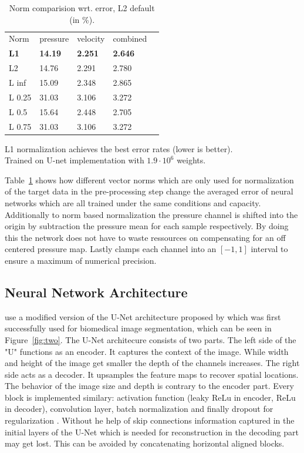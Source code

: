 \documentclass[acmtog]{techreportacmart}
\begin{document}
\begin{table}[h]
\caption{Norm comparision wrt. error, L2 default (in \%).}
\label{tab:one}
\begin{center}
\begin{tabular}{l|l|l|l|l}
  \toprule
  Norm   & pressure   &	velocity    & combined \\
  \bf L1	 & \bf 14.19	  & \bf 2.251		& \bf 2.646    \\
  L2	 & 14.76	  & 2.291		& 2.780	   \\
  L inf	 & 15.09	  & 2.348		& 2.865	   \\
  L 0.25 & 31.03	  & 3.106		& 3.272	   \\
  L 0.5  & 15.64	  & 2.448		& 2.705	   \\
  L 0.75 & 31.03	  & 3.106		& 3.272	   \\	
  \bottomrule
\end{tabular}
\end{center}
\bigskip\centering
\footnotesize L1 normalization achieves the best error rates (lower is better). \\
Trained on \cite{Thuerey20} U-net implementation with $1.9 \cdot 10^{6}$ weights.
\end{table}%

Table~\ref{tab:one} shows how different vector norms which are only used for normalization of the target data in the pre-processing step change the averaged error of neural networks which are all trained under the same conditions and capacity. \\
Additionally to norm based normalization the pressure channel is shifted into the origin by subtraction the pressure mean for each sample respectively. By doing this the network does not have to waste ressources on compensating for an off centered pressure map. Lastly \cite{Thuerey20} clamps each channel into an $[-1, 1]$ interval to ensure a maximum of numerical precision.

\subsection{Neural Network Architecture}
\cite{Thuerey20} use a modified version of the U-Net architecture proposed by \cite{ronneberger2015} which was first successfully used for biomedical image segmentation, which can be seen in Figure~\ref{fig:two}.
The U-Net architecure consists of two parts. The left side of the "U" functions as an encoder. It captures the context of the image. While width and height of the image get smaller the depth of the channels increases. The right side acts as a decoder. It upsamples the feature maps to recover spatial locations. The behavior of the image size and depth is contrary to the encoder part. Every block is implemented similary: activation function (leaky ReLu in encoder, ReLu in decoder), convolution layer, batch normalization and finally dropout for regularization \cite{Thuerey20}. Without he help of skip connections information captured in the initial layers of the U-Net which is needed for reconstruction in the decoding part may get lost. This can be avoided by concatenating horizontal aligned blocks.
\end{document}
